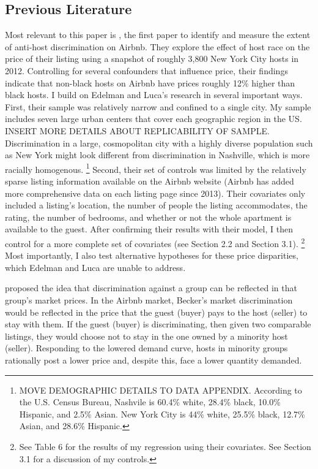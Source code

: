 \subsection{Previous Literature} 
Most relevant to this paper is \cite{edelman}, the first paper to identify and measure the extent of anti-host discrimination on Airbnb. They explore the effect of host race on the price of their listing using a snapshot of roughly 3,800 New York City hosts in 2012. Controlling for several confounders that influence price, their findings indicate that non-black hosts on Airbnb have prices roughly 12\% higher than black hosts. I build on Edelman and Luca's research in several important ways. First, their sample was relatively narrow and confined to a single city. My sample includes seven large urban centers that cover each geographic region in the US. INSERT MORE DETAILS ABOUT REPLICABILITY OF SAMPLE. Discrimination in a large, cosmopolitan city with a highly diverse population such as New York might look different from discrimination in Nashville, which is more racially homogenous.%
	\footnote{MOVE DEMOGRAPHIC DETAILS TO DATA APPENDIX. According to the U.S. Census Bureau, Nashvile is 60.4\% white, 28.4\% black, 10.0\% Hispanic, and 2.5\% Asian. New York City is 44\% white, 25.5\% black, 12.7\% Asian, and 28.6\% Hispanic.} 
Second, their set of controls was limited by the relatively sparse listing information available on the Airbnb website (Airbnb has added more comprehensive data on each listing page since 2013). Their covariates only included a listing's location, the number of people the listing accommodates, the rating, the number of bedrooms, and whether or not the whole apartment is available to the guest. After confirming their results with their model, I then control for a more complete set of covariates (see Section 2.2 and Section 3.1).%
	\footnote{See Table 6 for the results of my regression using their covariates. See Section 3.1 for a discussion of my controls.} 
Most importantly, I also test alternative hypotheses for these price disparities, which Edelman and Luca are unable to address. 

\cite{becker} proposed the idea that discrimination against a group can be reflected in that group's market prices. In the Airbnb market, Becker's market discrimination would be reflected in the price that the guest (buyer) pays to the host (seller) to stay with them. If the guest (buyer) is discriminating, then given two comparable listings, they would choose not to stay in the one owned by a minority host (seller). Responding to the lowered demand curve, hosts in minority groups rationally post a lower price and, despite this, face a lower quantity demanded. 

